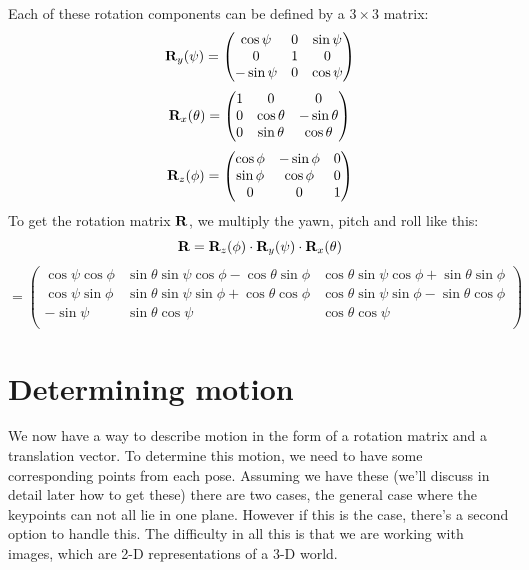 Each of these rotation components can be defined by a $3\times3$ matrix:
\begin{equation}
    \mathbf{R}_y(\psi) = \begin{pmatrix}
        \cos\psi & 0 & \sin\psi \\
        0 & 1 & 0 \\
        -\sin\psi & 0 & \cos\psi
    \end{pmatrix}
\end{equation}
\begin{equation}
    \mathbf{R}_x(\theta) = \begin{pmatrix}
        1 & 0 & 0 \\
        0 & \cos\theta & -\sin\theta \\
        0 & \sin\theta & \cos\theta \\
    \end{pmatrix}
\end{equation}
\begin{equation}
    \mathbf{R}_z(\phi) = \begin{pmatrix}
        \cos\phi & -\sin\phi & 0 \\
        \sin\phi & \cos\phi & 0 \\
        0 & 0 & 1
    \end{pmatrix}
\end{equation}
To get the rotation matrix $\mathbf{R}$, we multiply the yawn, pitch and roll like this:
\begin{equation}
    \mathbf{R} = \mathbf{R}_z(\phi)\cdot\mathbf{R}_y(\psi)\cdot\mathbf{R}_x(\theta)
\end{equation}
\begin{equation*}
    = \begin{pmatrix}
    \cos\psi\cos\phi & \sin\theta\sin\psi\cos\phi - \cos\theta\sin\phi & \cos\theta\sin\psi\cos\phi + \sin\theta\sin\phi \\
    \cos\psi\sin\phi & \sin\theta\sin\psi\sin\phi + \cos\theta\cos\phi & \cos\theta\sin\psi\sin\phi - \sin\theta\cos\phi \\
    -\sin\psi          & \sin\theta\cos\psi                                  & \cos\theta\cos\psi \\
  \end{pmatrix} 
\end{equation*}

\section{Determining motion}\label{sec:determmot}
We now have a way to describe motion in the form of a rotation matrix and a translation vector. To determine this motion, we need to have some corresponding points from each pose. Assuming we have these (we'll discuss in detail later how to get these) there are two cases, the general case where the keypoints can not all lie in one plane. However if this is the case, there's a second option to handle this. The difficulty in all this is that we are working with images, which are 2-D representations of a 3-D world. 

